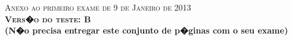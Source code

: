 \documentclass{docist}
\begin{document}
\thispagestyle{empty}

\begin{center}
  {\Large \textsc{Anexo ao primeiro exame de 9 de Janeiro de 2013\\[2ex]
      \textbf{Vers�o do teste: B}\\[2ex]}}
  {\normalsize  \textbf{(N�o precisa entregar este conjunto de p�ginas com o seu exame)}}
\end{center}



\wikipediaWarning

\qDomainLogicFenix

\qIncrementalReleases

\qScalability

\qSOA

\qAvailability

\qChromiumDecomposition

\qSecurity

\qSkeletonSystem

\qArqEmailMTAIMAP

\qAspects

\qZeroMQApps

\qZeroMQWorkersPerCore

\qZeroMQMessagingPatterns

\qZeroMQBatching

\qZeroMQLockFree

\qnginxFirstAD

\qnginxEventDriven

\qnginxModuleTypes

\qnginxProcessThread

\qnginxOSOptimizations

\qGHCStakeholders

\qGHCChunks

\qGHCDesugaring

\qGHCRTS

\qGHCPipeAndFilter

\qWebPartioning

\qWebPartitioningDois

\qWebRedundancy

\qThreeVsFourTiers

\qWebLoadBalancer
\end{document}
